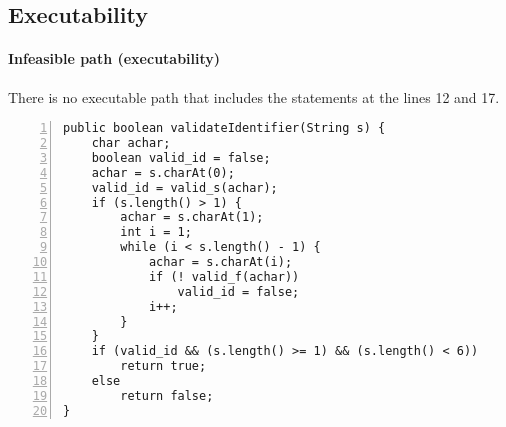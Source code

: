 \subsection*{Executability}
\label{example:limitation-executability}


\begin{frame}
\framesubtitle{Infeasible path (executability)}

There is no executable path that includes the statements at the lines 12 and 17.

\begin{lstlisting}[numbers=left]
public boolean validateIdentifier(String s) {
    char achar;
    boolean valid_id = false;
    achar = s.charAt(0);
    valid_id = valid_s(achar);
    if (s.length() > 1) {
        achar = s.charAt(1);
        int i = 1;
        while (i < s.length() - 1) {
            achar = s.charAt(i);
            if (! valid_f(achar))
                valid_id = false;
            i++;
        }
    }
    if (valid_id && (s.length() >= 1) && (s.length() < 6))
        return true;
    else
        return false;
}
\end{lstlisting}

\end{frame}
